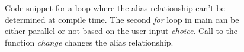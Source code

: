 \documentclass[10pt]{report}          %
\begin{document}
\begin{figure}[h]
\begin{center}
\caption{Code snippet for a loop where the alias relationship can't be determined at compile time.  The second \textit{for} loop in main can be either parallel or not based on the user input \textit{choice}.  Call to the function \textit{change} changes the alias relationship.}
\end{center}
\label{fig:example1}
\end{figure}
\end{document}
